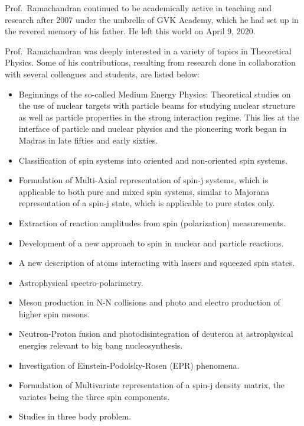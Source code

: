 Prof.\ Ramachandran continued to be academically active in teaching and research after 2007 under the umbrella of GVK Academy, which he had set up in the revered memory of his father. He left this world on April 9, 2020.

Prof.\ Ramachandran was deeply interested in a variety of topics in Theoretical Physics. Some of his contributions, resulting from research done in collaboration with several colleagues and students, are listed below:
\begin{itemize}
\item Beginnings of the so-called Medium Energy Physics: Theoretical studies on the use of nuclear targets with particle beams for studying nuclear structure as well as particle properties in the strong interaction regime. This lies at the interface of particle and nuclear physics and the pioneering work began in Madras in late fifties and early sixties.

\item Classification of spin systems into oriented and non-oriented spin systems.

\item Formulation of Multi-Axial representation of spin-j systems, which is applicable to both pure and mixed spin systems, similar to Majorana representation of a spin-j state, which is applicable to pure states only.

\item Extraction of reaction amplitudes from spin (polarization) measurements.

\item Development of a new approach to spin in nuclear and particle reactions.

\item A new description of atoms interacting with lasers and squeezed spin states.

\item Astrophysical spectro-polarimetry.

\item Meson production in N-N collisions and photo and electro production of higher spin mesons.

\item Neutron-Proton fusion and photodisintegration of deuteron at astrophysical energies relevant to big bang nucleosynthesis.

\item Investigation of Einstein-Podolsky-Rosen (EPR) phenomena.

\item Formulation of Multivariate representation of a spin-j density matrix, the variates being the three spin components.

\item Studies in three body problem.
\end{itemize}

